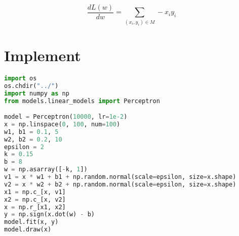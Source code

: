 \documentclass{report}
\begin{document}
$$
\frac{dL(w)}{dw}=\sum_{(x_i,y_i)\in M} -x_i y_i
$$
\section{Implement}
\begin{lstlisting}[language={python}]
%matplotlib inline
import os
os.chdir("../")
import numpy as np
from models.linear_models import Perceptron

model = Perceptron(10000, lr=1e-2)
x = np.linspace(0, 100, num=100)
w1, b1 = 0.1, 5
w2, b2 = 0.2, 10
epsilon = 2
k = 0.15
b = 8
w = np.asarray([-k, 1])
v1 = x * w1 + b1 + np.random.normal(scale=epsilon, size=x.shape)
v2 = x * w2 + b2 + np.random.normal(scale=epsilon, size=x.shape)
x1 = np.c_[x, v1]
x2 = np.c_[x, v2]
x = np.r_[x1, x2]
y = np.sign(x.dot(w) - b)
model.fit(x, y)
model.draw(x)
\end{lstlisting}
\end{document}
